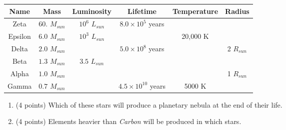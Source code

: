 \documentclass[12pt]{article}
\begin{document}
\begin{enumerate}
\begin{center}
	\begin{tabular}{ |c | c | c | c |c | c |}
	\hline
		Name & Mass & Luminosity & Lifetime & Temperature & Radius \\\hline
		Zeta & $60.$ $ M_{sun}$  & $10^6$ $ L_{sun}$ & $8.0 \times 10^5$ years &  & \\\hline
		Epsilon & $6.0 $ $M_{sun}$ & $10^3$ $ L_{sun}$ & & 20,000 K &  \\\hline
		Delta & $2.0$ $ M_{sun}$ &  &  $5.0 \times 10^8$ years &  & 2 $R_{sun}$\\\hline
		Beta & $1.3$ $ M_{sun}$ & $3.5$ $ L_{sun}$ &  &  &  \\\hline
		Alpha & $1.0 $ $M_{sun}$ &  &  &  & 1 $R_{sun}$ \\\hline
		Gamma & $0.7$ $ M_{sun}$ &  &  $4.5 \times 10^{10}$ years & 5000 K &  \\
	\hline
	\end{tabular}
\end{center}



\begin{enumerate}
\item\noindent (4 points) Which of these stars will produce a planetary nebula at the end of their life. 
\\
\item\noindent (4 points) Elements heavier than \emph{Carbon} will be produced in which stars.
\end{enumerate} 

\end{enumerate}
\end{document}
